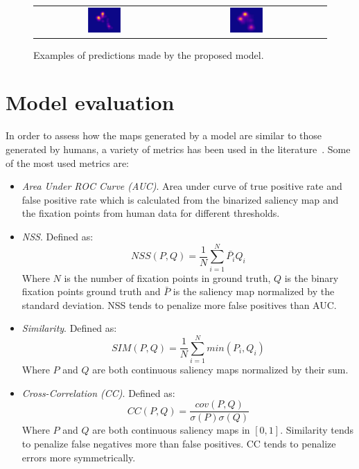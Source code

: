 \documentclass[journal]{IEEEtran}
\begin{document}
\begin{figure}
\begin{center}
\begin{tabular} {ccc}
    \includegraphics[width=0.25\textwidth]{./img/sign_gt.jpg} &
    \includegraphics[width=0.25\textwidth]{./img/sign_m.jpg}\\
    \end{tabular}
\end{center}
    \caption{Examples of predictions made by the proposed model.}
    \label{fig:preds}
\end{figure}

\section{Model evaluation}
\label{sec:metrics}
In order to assess how the maps generated by a model are similar to those
generated by humans, a variety of metrics has been used in the
literature~\cite{judd_2016}.
Some of the most used metrics are:
\begin{itemize}
    \item \emph{Area Under ROC Curve (AUC)}.
    Area under curve of true positive rate and false positive rate which is
    calculated from the binarized saliency map and the fixation points
    from human data for different thresholds.

    \item \emph{NSS}.
    Defined as:
	$$NSS(P, Q) = \frac{1}{N}\sum\limits_{i=1}^N{\bar{P_{i}}Q_{i}}$$
    Where $N$ is the number of fixation points in ground truth,
    $Q$ is the binary fixation points ground truth and $\bar{P}$ is the
    saliency map normalized by the standard deviation.
    NSS tends to penalize more false positives than AUC.

    \item \emph{Similarity}.
    Defined as:
	$$SIM(P, Q) = \frac{1}{N}\sum\limits_{i=1}^N{min(P_i, Q_i)}$$
    Where $P$ and $Q$ are both continuous saliency maps normalized
    by their sum.

    \item \emph{Cross-Correlation (CC)}.
    Defined as:
	$$CC(P, Q) = \frac{cov(P,Q)}{\sigma(P)\sigma(Q)}$$
    Where $P$ and $Q$ are both continuous saliency maps in $[0, 1]$.
    Similarity tends to penalize false negatives more than false positives.
    CC tends to penalize errors more symmetrically.
\end{itemize}
\end{document}
